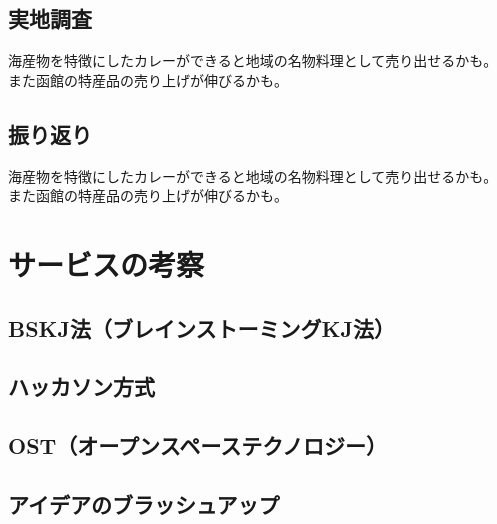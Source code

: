 \documentclass[openany,11pt,papersize]{jsbook}
\begin{document}

\subsection{実地調査}

海産物を特徴にしたカレーができると地域の名物料理として売り出せるかも。 
また函館の特産品の売り上げが伸びるかも。


\subsection{振り返り}

海産物を特徴にしたカレーができると地域の名物料理として売り出せるかも。 
また函館の特産品の売り上げが伸びるかも。



\section{サービスの考察}\label{sec:tejun}

\subsection{BSKJ法（ブレインストーミングKJ法）}


\subsection{ハッカソン方式}


\subsection{OST（オープンスペーステクノロジー）}


\subsection{アイデアのブラッシュアップ}

\end{document}
